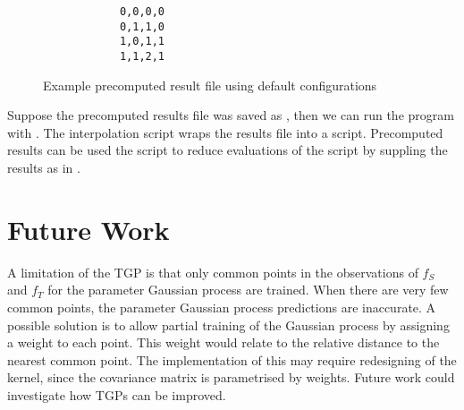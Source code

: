 \documentclass[10pt,a4paper]{article}
\begin{document}
\begin{figure}[H]
	\begin{framed}
		\begin{verbatim}
			0,0,0,0
			0,1,1,0
			1,0,1,1
			1,1,2,1
		\end{verbatim}
	\end{framed}
	\caption{Example precomputed result file using default configurations}
\end{figure}

Suppose the precomputed results file was saved as , then we can run the program with . The interpolation script wraps the results file into a script. Precomputed results can be used the script to reduce evaluations of the script by suppling the results as in .

\section{Future Work}

A limitation of the TGP is that only common points in the observations of $f_S$ and $f_T$ for the parameter Gaussian process are trained. When there are very few common points, the parameter Gaussian process predictions are inaccurate. A possible solution is to allow partial training of the Gaussian process by assigning a weight to each point. This weight would relate to the relative distance to the nearest common point. The implementation of this may require redesigning of the kernel, since the covariance matrix is parametrised by weights. Future work could investigate how TGPs can be improved.



\end{document}
